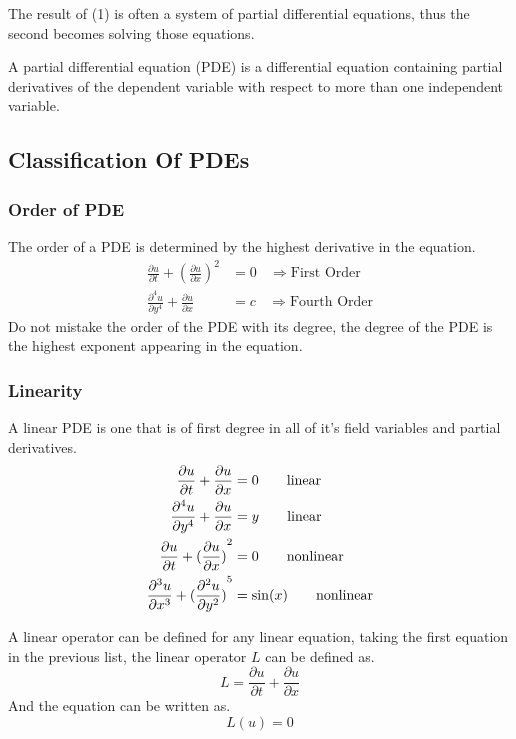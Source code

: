\documentclass[]{article}
\begin{document}
The result of (1) is often a system of partial differential equations, thus the second becomes solving those equations.
\ \\ 
\begin{definition}
    A partial differential equation (PDE) is a differential equation containing partial derivatives of the dependent variable with respect to more than one independent variable.
\end{definition}

\subsection{Classification Of PDEs}
\subsubsection{Order of PDE}
The order of a PDE is determined by the highest derivative in the equation.
\begin{align*}
\frac{\partial u}{\partial t} + {(\frac{\partial u}{\partial x})}^2 &= 0 \ \ \ \ \Longrightarrow  \text{First Order}
\\
\frac{\partial^4 u}{\partial y^4} + \frac{\partial u}{\partial x} &= c \ \ \ \ \Longrightarrow  \text{Fourth Order}
\end{align*}
Do not mistake the order of the PDE with its degree, the degree of the PDE is the highest exponent appearing in the equation.
\subsubsection{Linearity} 
A linear PDE is one that is of first degree in all of it's field variables and partial derivatives.
\begin{align*}
\frac{\partial u}{\partial t} + \frac{\partial u}{\partial x} &= 0 \quad\quad \text{linear}
\\
\frac{\partial^4 u}{\partial y^4} + \frac{\partial u}{\partial x} &= y \quad\quad \text{linear}
\\
\frac{\partial u}{\partial t} + {(\frac{\partial u}{\partial x})}^2 &= 0 \quad\quad \text{nonlinear}
\\
\frac{\partial^3 u}{\partial x^3} + {(\frac{\partial^2 u}{\partial y^2})}^5 &= \sin(x) \quad\quad \text{nonlinear}
\end{align*}

A linear operator can be defined for any linear equation, taking the first equation in the previous list, the linear operator $L$ can be defined as.
\[
L = \frac{\partial u }{\partial t} + \frac{\partial u}{\partial x}
\]
And the equation can be written as.
\[
    L(u)=0    
\]
\end{document}
